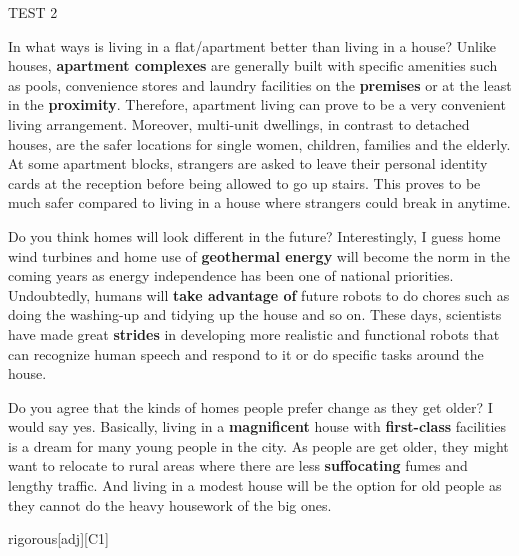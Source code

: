 \begin{glossarymc}[Cambridge 14]
\begin{test}{TEST 2}
    \begin{qa}{In what ways is living in a flat/apartment better than living in a house?}
    Unlike houses, \textbf{apartment complexes} are generally built with specific amenities such as pools, convenience stores and laundry facilities on the \textbf{premises} or at the least in the \textbf{proximity}. Therefore, apartment living can prove to be a very convenient living arrangement. Moreover, multi-unit dwellings, in contrast to detached houses, are the safer locations for single women, children, families and the elderly. At some apartment blocks, strangers are asked to leave their personal identity cards at the reception before being allowed to go up stairs. This proves to be much safer compared to living in a house where strangers could break in anytime.
    \end{qa}

    \begin{qa}{Do you think homes will look different in the future?}
    Interestingly, I guess home wind turbines and home use of \textbf{geothermal energy} will become the norm in the coming years as energy independence has been one of national priorities. Undoubtedly, humans will \textbf{take advantage of} future robots to do chores such as doing the washing-up and tidying up the house and so on. These days, scientists have made great \textbf{strides} in developing more realistic and functional robots that can recognize human speech and respond to it or do specific tasks around the house.
    \end{qa}

    \begin{qa}{Do you agree that the kinds of homes people prefer change as they get older?}
    I would say yes. Basically, living in a \textbf{magnificent} house with \textbf{first-class} facilities is a dream for many young people in the city. As people are get older, they might want to relocate to rural areas where there are less \textbf{suffocating} fumes and lengthy traffic. And living in a modest house will be the option for old people as they cannot do the heavy housework of the big ones.
    \end{qa}

        \begin{VocabExplain}[Part 3]
            \begin{ExplainCard}{rigorous}[adj][C1]
            \end{ExplainCard}


\end{VocabExplain}
\end{test}
\end{glossarymc}
